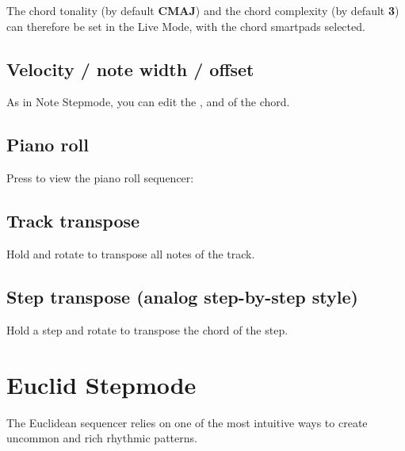 The chord tonality (by default \textbf{CMAJ}) and the chord complexity (by default \textbf{3}) can therefore be set in the Live Mode, with the chord smartpads selected.


\subsection{Velocity / note width / offset}
As in Note Stepmode, you can edit the ,  and  of the chord.

\subsection{Piano roll}

Press  to view the piano roll sequencer:



\subsection{Track transpose}

Hold  and rotate \encodericon{} to transpose all notes of the track.

\subsection{Step transpose (analog step-by-step style)}

Hold a step \padsicon{} and rotate \encodericon{} to transpose the chord of the step.


\section{Euclid Stepmode}

The Euclidean sequencer relies on one of the most intuitive ways to create uncommon and rich rhythmic patterns.

